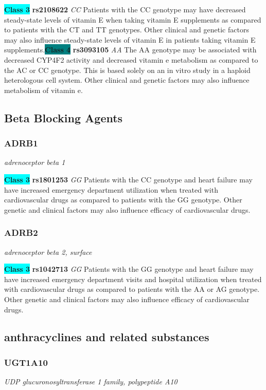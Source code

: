 \documentclass{report}
\begin{document}
\textbf{\colorbox{cyan} {Class 3}} \textbf{ rs2108622 } \textit{ CC }
Patients with the CC genotype may have decreased steady-state levels of vitamin E when taking vitamin E supplements as compared to patients with the CT and TT genotypes. Other clinical and genetic factors may also influence steady-state levels of vitamin E in patients taking vitamin E supplements.\newline\textbf{\colorbox{teal} {Class 4}} \textbf{ rs3093105 } \textit{ AA }
The AA genotype may be associated with decreased CYP4F2 activity and decreased vitamin e metabolism as compared to the AC or CC genotype. This is based solely on an in vitro study in a haploid heterologous cell system. Other clinical and genetic factors may also influence metabolism of vitamin e.\newline\subsection{ Beta Blocking Agents }\subsubsection{ ADRB1 }
\textit{ adrenoceptor beta 1 }

\textbf{\colorbox{cyan} {Class 3}} \textbf{ rs1801253 } \textit{ GG }
Patients with the CC genotype and heart failure may have increased emergency department utilization when treated with cardiovascular drugs as compared to patients with the GG genotype. Other genetic and clinical factors may also influence efficacy of cardiovascular drugs.\newline\subsubsection{ ADRB2 }
\textit{ adrenoceptor beta 2, surface }

\textbf{\colorbox{cyan} {Class 3}} \textbf{ rs1042713 } \textit{ GG }
Patients with the GG genotype and heart failure may have increased emergency department visits and hospital utilization when treated with cardiovascular drugs as compared to patients with the AA or AG genotype. Other genetic and clinical factors may also influence efficacy of cardiovascular drugs.\newline\subsection{ anthracyclines and related substances }\subsubsection{ UGT1A10 }
\textit{ UDP glucuronosyltransferase 1 family, polypeptide A10 }
\end{document}
